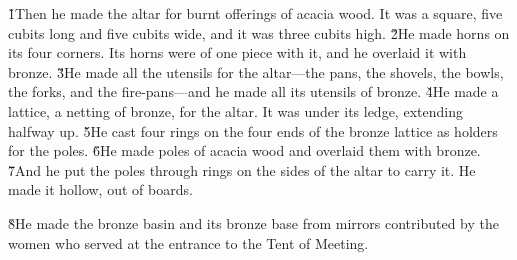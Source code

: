 \v{1}Then he made the altar for burnt offerings of acacia wood. It was a square, five cubits long and five cubits wide, and it was three cubits high. \v{2}He made horns on its four corners. Its horns were of one piece with it, and he overlaid it with bronze. \v{3}He made all the utensils for the altar---the pans, the shovels, the bowls, the forks, and the fire-pans---and he made all its utensils of bronze. \v{4}He made a lattice, a netting of bronze, for the altar. It was under its ledge, extending halfway up. \v{5}He cast four rings on the four ends of the bronze lattice as holders for the poles. \v{6}He made poles of acacia wood and overlaid them with bronze. \v{7}And he put the poles through rings on the sides of the altar to carry it. He made it hollow, out of boards.

\v{8}He made the bronze basin and its bronze base from mirrors contributed by the women who served at the entrance to the Tent of Meeting.


